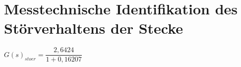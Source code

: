 
\newpage

\section{Messtechnische Identifikation des Störverhaltens der Stecke}

$ G(s)_{stoer} = \dfrac{2,6424}{1 + 0,16207} $